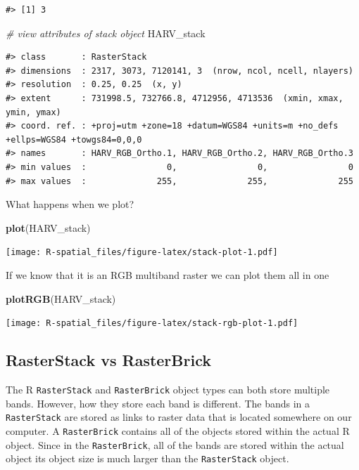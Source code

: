 \documentclass[]{book}
\newenvironment{Shaded}{\begin{snugshade}}{\end{snugshade}}
\newcommand{\KeywordTok}[1]{\textcolor[rgb]{0.13,0.29,0.53}{\textbf{#1}}}
\newcommand{\CommentTok}[1]{\textcolor[rgb]{0.56,0.35,0.01}{\textit{#1}}}
\newcommand{\NormalTok}[1]{#1}
\begin{document}
\begin{verbatim}
#> [1] 3
\end{verbatim}

\begin{Shaded}
\begin{Highlighting}[]
\CommentTok{# view attributes of stack object}
\NormalTok{HARV_stack}
\end{Highlighting}
\end{Shaded}

\begin{verbatim}
#> class       : RasterStack 
#> dimensions  : 2317, 3073, 7120141, 3  (nrow, ncol, ncell, nlayers)
#> resolution  : 0.25, 0.25  (x, y)
#> extent      : 731998.5, 732766.8, 4712956, 4713536  (xmin, xmax, ymin, ymax)
#> coord. ref. : +proj=utm +zone=18 +datum=WGS84 +units=m +no_defs +ellps=WGS84 +towgs84=0,0,0 
#> names       : HARV_RGB_Ortho.1, HARV_RGB_Ortho.2, HARV_RGB_Ortho.3 
#> min values  :                0,                0,                0 
#> max values  :              255,              255,              255
\end{verbatim}

What happens when we plot?

\begin{Shaded}
\begin{Highlighting}[]
\KeywordTok{plot}\NormalTok{(HARV_stack)}
\end{Highlighting}
\end{Shaded}

\texttt{[image: R-spatial\_files/figure-latex/stack-plot-1.pdf]}

If we know that it is an RGB multiband raster we can plot them all in
one

\begin{Shaded}
\begin{Highlighting}[]
\KeywordTok{plotRGB}\NormalTok{(HARV_stack)}
\end{Highlighting}
\end{Shaded}

\texttt{[image: R-spatial\_files/figure-latex/stack-rgb-plot-1.pdf]}

\subsection{RasterStack vs
RasterBrick}\label{rasterstack-vs-rasterbrick}

The R \texttt{RasterStack} and \texttt{RasterBrick} object types can
both store multiple bands. However, how they store each band is
different. The bands in a \texttt{RasterStack} are stored as links to
raster data that is located somewhere on our computer. A
\texttt{RasterBrick} contains all of the objects stored within the
actual R object. Since in the \texttt{RasterBrick}, all of the bands are
stored within the actual object its object size is much larger than the
\texttt{RasterStack} object.
\end{document}
